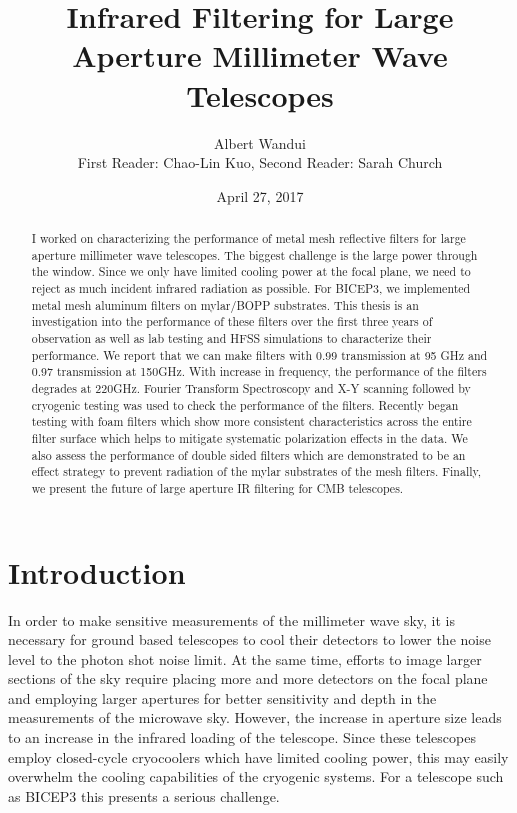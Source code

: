 \documentclass[12pt]{article}
\begin{document}
\title{Infrared Filtering for Large Aperture Millimeter Wave Telescopes}
\author{Albert Wandui \\
First Reader: Chao-Lin Kuo, Second Reader: Sarah Church}
\date{April 27, 2017}
\maketitle
\begin{abstract}
I worked on characterizing the performance of metal mesh reflective filters for large aperture millimeter wave telescopes. The biggest challenge is the large power through the window. Since we only have limited cooling power at the focal plane, we need to reject as much incident infrared radiation as possible. For BICEP3, we implemented metal mesh aluminum filters on mylar/BOPP substrates. This thesis is an investigation into the performance of these filters over the first three years of observation as well as lab testing and HFSS simulations to characterize their performance. We report that we can make filters with 0.99 transmission at 95 GHz and 0.97 transmission at 150GHz. With increase in frequency, the performance of the filters degrades at 220GHz. Fourier Transform Spectroscopy and X-Y scanning followed by cryogenic testing was used to check the performance of the filters. Recently began testing with foam filters which show more consistent characteristics across the entire filter surface which helps to mitigate systematic polarization effects in the data. We also assess the performance of double sided filters which are demonstrated to be an effect strategy to prevent radiation of the mylar substrates of the mesh filters. Finally, we present the future of large aperture IR filtering for CMB telescopes. 
\end{abstract}
\section{Introduction}

In order to make sensitive measurements of the millimeter wave sky, it is necessary for ground based telescopes to cool their detectors to lower the noise level to the photon shot noise limit. At the same time, efforts to image larger sections of the sky require placing more and more detectors on the focal plane and employing larger apertures for better sensitivity and depth in the measurements of the microwave sky. However, the increase in aperture size leads to an increase in the infrared loading of the telescope. Since these telescopes employ closed-cycle cryocoolers which have limited cooling power, this may easily overwhelm the cooling capabilities of the cryogenic systems. For a telescope such as BICEP3 this presents a serious challenge.
\end{document}
